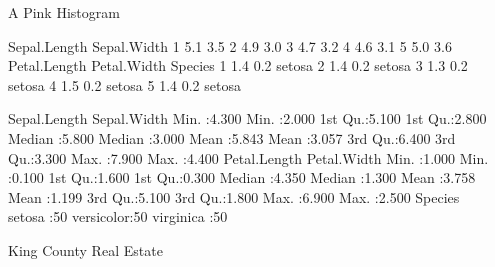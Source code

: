 \documentclass[final]{beamer}
\begin{document}
\begin{frame}[fragile]
\begin{columns}[t]
\begin{column}{0.31\linewidth}
\begin{minipage}[t][.955\textheight]{\linewidth}
\vfill%
\vspace{0ex}
\begin{block}{A Pink Histogram}
\vspace{0ex}
\begin{Schunk}
\begin{Soutput}
  Sepal.Length Sepal.Width
1          5.1         3.5
2          4.9         3.0
3          4.7         3.2
4          4.6         3.1
5          5.0         3.6
  Petal.Length Petal.Width Species
1          1.4         0.2  setosa
2          1.4         0.2  setosa
3          1.3         0.2  setosa
4          1.5         0.2  setosa
5          1.4         0.2  setosa
\end{Soutput}
\begin{Soutput}
  Sepal.Length    Sepal.Width   
 Min.   :4.300   Min.   :2.000  
 1st Qu.:5.100   1st Qu.:2.800  
 Median :5.800   Median :3.000  
 Mean   :5.843   Mean   :3.057  
 3rd Qu.:6.400   3rd Qu.:3.300  
 Max.   :7.900   Max.   :4.400  
  Petal.Length    Petal.Width   
 Min.   :1.000   Min.   :0.100  
 1st Qu.:1.600   1st Qu.:0.300  
 Median :4.350   Median :1.300  
 Mean   :3.758   Mean   :1.199  
 3rd Qu.:5.100   3rd Qu.:1.800  
 Max.   :6.900   Max.   :2.500  
       Species  
 setosa    :50  
 versicolor:50  
 virginica :50  
\end{Soutput}
\end{Schunk}
\vspace{0ex}
\end{block}
\vfill

\vspace{0ex}
\begin{block}{King County Real Estate}
\vspace{0ex}
\vspace{0ex}
\end{block}
\vfill

\end{minipage}
\end{column}%

\begin{column}{0.31\linewidth}
\begin{minipage}[t][.955\textheight]{\linewidth} 


\end{minipage}
\end{column}
\end{columns}
\end{frame}
\end{document}
